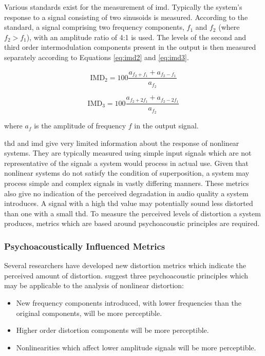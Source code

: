 			Various standards exist for the measurement of \acrshort{imd}. Typically the system's response to a
			signal consisting of two sinusoids is measured. According to the \citet{IEC2001amplifiers}
			standard, a signal comprising two frequency components, $f_{1}$ and $f_{2}$ (where $f_{2} >
			f_{1}$), with an amplitude ratio of 4:1 is used.  The levels of the second and third order
			intermodulation components present in the output is then measured separately according to Equations
			\ref{eq:imd2} and \ref{eq:imd3}.

			\begin{equation}
				\mathrm{IMD}_{2} = 100\frac{a_{f_{2} + f_{1}} + a_{f_{2} - f_{1}}}{a_{f_{2}}}
				\label{eq:imd2}
			\end{equation}

			\begin{equation}
				\mathrm{IMD}_{3} = 100\frac{a_{f_{2} + 2f_{1}} + a_{f_{2} - 2f_{1}}}{a_{f_{2}}}
				\label{eq:imd3}
			\end{equation}

			where $a_{f}$ is the amplitude of frequency $f$ in the output signal.

			\acrshort{thd} and \acrshort{imd} give very limited information about the response of nonlinear
			systems. They are typically measured using simple input signals which are not representative of the
			signals a system would process in actual use. Given that nonlinear systems do not satisfy the
			condition of superposition, a system may process simple and complex signals in vastly differing
			manners. These metrics also give no indication of the perceived degradation in audio quality a
			system introduces.  A signal with a high \acrshort{thd} value may potentially sound less distorted
			than one with a small \acrshort{thd}. To measure the perceived levels of distortion a system
			produces, metrics which are based around psychoacoustic principles are required.

		\subsubsection*{Psychoacoustically Influenced Metrics}
			Several researchers have developed new distortion metrics which indicate the perceived amount of
			distortion. \citet{geddes2003auditory} suggest three psychoacoustic principles which may be
			applicable to the analysis of nonlinear distortion:

			\begin{itemize}
				\item New frequency components introduced, with lower frequencies than the original
					components, will be more perceptible.
				\item Higher order distortion components will be more perceptible.
				\item Nonlinearities which affect lower amplitude signals will be more perceptible.
			\end{itemize}

